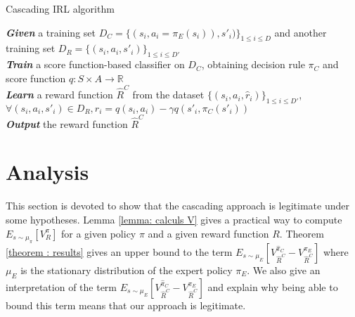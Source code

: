 \documentclass[11pt]{article}
\newcommand{\0}{\mathbf{0}}
\newcommand{\1}{\mathbf{1}}
\begin{document}
\begin{algorithm}%
  \caption{Cascading IRL algorithm}
  \label{algo:cascading}
  \emph{\textbf{Given}} a training set $D_C=\{(s_i,a_i=\pi_E(s_i)),s'_i)\}_{1\leq i \leq D}$ and another training set $D_R=\{(s_{i},a_{i},s'_{i})\}_{1\leq i \leq D'}$\;\\
  \emph{\textbf{Train}} a score function-based classifier on $D_C$, obtaining decision rule $\pi_C$ and score function $q:S\times A \rightarrow \mathbb R$\;\\
  \emph{\textbf{Learn}} a reward function $\hat R^C$ from the dataset $\{(s_{i},a_{i},\hat{r}_i)\}_{1\leq i \leq D'}$, $\forall (s_i,a_i,s'_i) \in D_R,\hat{r}_i=q(s_{i},a_{i})-\gamma q(s'_{i},\pi_C(s'_{i}))$\;\\
  \emph{\textbf{Output}} the reward function $\hat R^{C}$ \;
\end{algorithm}
\section{Analysis}
\label{sec-4}

\label{section: Analysis}
This section is devoted to show that the cascading approach is legitimate under some hypotheses. Lemma \ref{lemma: calculs V}  gives a practical way to compute $E_{s\sim\mu_\pi}[V^\pi_R]$ for a given policy $\pi$ and a given reward function $R$. Theorem \ref{theorem : results}  gives an upper bound to the term $E_{s\sim\mu_E}[V^{\hat{\pi}_C}_{\hat{R}^C}-V^{\pi_E}_{\hat{R}^C}]$ where $\mu_E$ is the stationary distribution of the expert policy $\pi_E$. We also give an interpretation of the term $E_{s\sim\mu_E}[V^{\hat{\pi}_C}_{\hat{R}^C}-V^{\pi_E}_{\hat{R}^C}]$ and explain why being able to bound this term means that our approach is legitimate.
\end{document}
